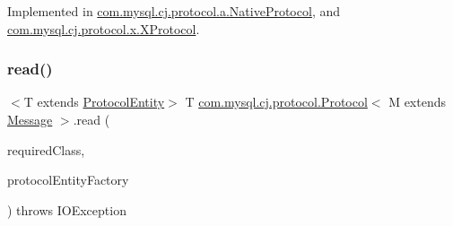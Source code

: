 Implemented in \mbox{\hyperlink{classcom_1_1mysql_1_1cj_1_1protocol_1_1a_1_1_native_protocol_a176849031728bdd55f4904b7a38ffa99}{com.\+mysql.\+cj.\+protocol.\+a.\+Native\+Protocol}}, and \mbox{\hyperlink{classcom_1_1mysql_1_1cj_1_1protocol_1_1x_1_1_x_protocol_ae1b4af5ef2c1ef4f6b9edc74095ea43c}{com.\+mysql.\+cj.\+protocol.\+x.\+X\+Protocol}}.

\mbox{\label{interfacecom_1_1mysql_1_1cj_1_1protocol_1_1_protocol_a48ee5ee3c590b73b47b2094694730319}} 
\subsubsection{\texorpdfstring{read()}{read()}\hspace{0.1cm}{\footnotesize\ttfamily [1/2]}}
{\footnotesize\ttfamily $<$T extends \mbox{\hyperlink{interfacecom_1_1mysql_1_1cj_1_1protocol_1_1_protocol_entity}{Protocol\+Entity}}$>$ T \mbox{\hyperlink{interfacecom_1_1mysql_1_1cj_1_1protocol_1_1_protocol}{com.\+mysql.\+cj.\+protocol.\+Protocol}}$<$ M extends \mbox{\hyperlink{interfacecom_1_1mysql_1_1cj_1_1protocol_1_1_message}{Message}} $>$.read (\begin{DoxyParamCaption}\item[{Class$<$ T $>$}]{required\+Class,  }\item[{\mbox{\hyperlink{interfacecom_1_1mysql_1_1cj_1_1protocol_1_1_protocol_entity_factory}{Protocol\+Entity\+Factory}}$<$ T, M $>$}]{protocol\+Entity\+Factory }\end{DoxyParamCaption}) throws I\+O\+Exception}

\mbox{\label{interfacecom_1_1mysql_1_1cj_1_1protocol_1_1_protocol_ae33a71067b314435408526d35f521207}} 
